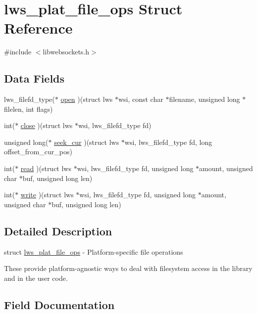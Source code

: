 \hypertarget{structlws__plat__file__ops}{}\section{lws\+\_\+plat\+\_\+file\+\_\+ops Struct Reference}
\label{structlws__plat__file__ops}


{\ttfamily \#include $<$libwebsockets.\+h$>$}

\subsection*{Data Fields}
\begin{DoxyCompactItemize}
\item 
lws\+\_\+filefd\+\_\+type($\ast$ \hyperlink{structlws__plat__file__ops_ad37a97abc68d0af967cef874f4d8df32}{open} )(struct lws $\ast$wsi, const char $\ast$filename, unsigned long $\ast$filelen, int flags)
\item 
int($\ast$ \hyperlink{structlws__plat__file__ops_a034ec96f2fbaf52b4aa3e82d20795f7b}{close} )(struct lws $\ast$wsi, lws\+\_\+filefd\+\_\+type fd)
\item 
unsigned long($\ast$ \hyperlink{structlws__plat__file__ops_abfcda19b003dcc13c61ff9e2bb4ff869}{seek\+\_\+cur} )(struct lws $\ast$wsi, lws\+\_\+filefd\+\_\+type fd, long offset\+\_\+from\+\_\+cur\+\_\+pos)
\item 
int($\ast$ \hyperlink{structlws__plat__file__ops_a01f483807a9862736b17ba9ed5110c40}{read} )(struct lws $\ast$wsi, lws\+\_\+filefd\+\_\+type fd, unsigned long $\ast$amount, unsigned char $\ast$buf, unsigned long len)
\item 
int($\ast$ \hyperlink{structlws__plat__file__ops_a1fae8330ee94649a3551e31a30809793}{write} )(struct lws $\ast$wsi, lws\+\_\+filefd\+\_\+type fd, unsigned long $\ast$amount, unsigned char $\ast$buf, unsigned long len)
\end{DoxyCompactItemize}


\subsection{Detailed Description}
struct \hyperlink{structlws__plat__file__ops}{lws\+\_\+plat\+\_\+file\+\_\+ops} -\/ Platform-\/specific file operations

These provide platform-\/agnostic ways to deal with filesystem access in the library and in the user code. 

\subsection{Field Documentation}

